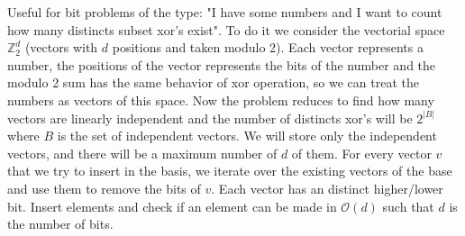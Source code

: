     Useful for bit problems of the type: "I have some numbers and I want to count how many distincts subset xor's exist". To do it we consider the vectorial space $\mathbb{Z}^d_2$ (vectors with $d$ positions and taken modulo 2). Each vector represents a number, the positions of the vector represents the bits of the number and the modulo 2 sum has the same behavior of xor operation, so we can treat the numbers as vectors of this space. Now the problem reduces to find how many vectors are linearly independent and the number of distincts xor's will be $2^{|B|}$ where $B$ is the set of independent vectors. We will store only the independent vectors, and there will be a maximum number of $d$ of them. For every vector $v$ that we try to insert in the basis, we iterate over the existing vectors of the base and use them to remove the bits of $v$. Each vector has an distinct higher/lower bit. Insert elements and check if an element can be made in $\mathcal{O}(d)$ such that $d$ is the number of bits.

